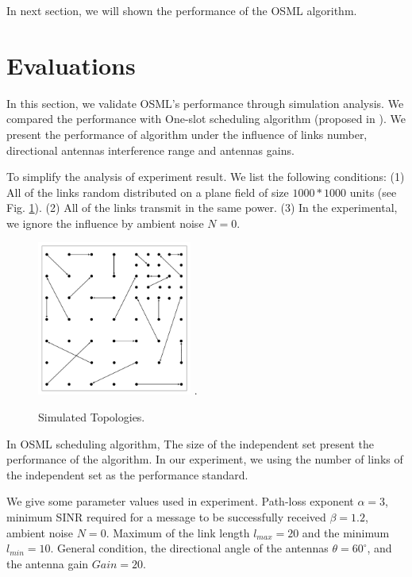 \documentclass[conference]{IEEEtran}
\begin{document}
In next section, we will shown the performance of the OSML algorithm.




\section{Evaluations}
In this section, we validate OSML's performance through simulation analysis. We compared the performance with One-slot scheduling algorithm (proposed in \cite{2}). We present the performance of algorithm under the influence of links number, directional antennas interference range and antennas gains.

To simplify the analysis of experiment result. We list the following conditions:
(1) All of the links random distributed on a plane field of size $1000*1000$ units (see Fig. \ref{Simulated Topologies}).
(2) All of the links transmit in the same power.
(3) In the experimental, we ignore the influence by ambient noise $N=0$.

\begin{figure}[htpb]
\centering
\includegraphics[width=2in]{image/topology.pdf}
\DeclareGraphicsExtensions.
\caption{Simulated Topologies.}
\label{Simulated Topologies}
\end{figure}

In OSML scheduling algorithm, The size of the independent set present the performance of the algorithm. In our experiment, we using the number of links of the independent set as the performance standard.

 We give some parameter values used in experiment. Path-loss exponent $\alpha =3$, minimum SINR required for a message to be successfully received $\beta =1.2$, ambient noise $N=0$. Maximum of the link length $l_{max}=20$ and the minimum $l_{min}=10$. General condition, the directional angle of the antennas $\theta =60^{\circ}$, and the antenna gain $Gain=20$.
\end{document}
